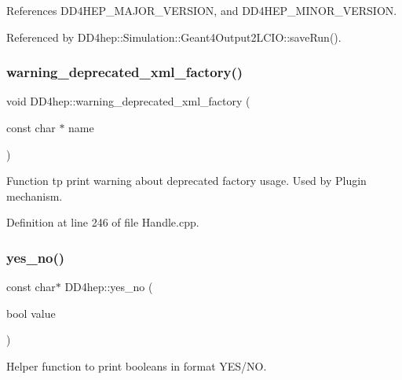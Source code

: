 References D\+D4\+H\+E\+P\+\_\+\+M\+A\+J\+O\+R\+\_\+\+V\+E\+R\+S\+I\+ON, and D\+D4\+H\+E\+P\+\_\+\+M\+I\+N\+O\+R\+\_\+\+V\+E\+R\+S\+I\+ON.



Referenced by D\+D4hep\+::\+Simulation\+::\+Geant4\+Output2\+L\+C\+I\+O\+::save\+Run().

\hypertarget{namespace_d_d4hep_a1726e0eed52fa5804e004e72e8c73775}{}\label{namespace_d_d4hep_a1726e0eed52fa5804e004e72e8c73775} 
\subsubsection{\texorpdfstring{warning\+\_\+deprecated\+\_\+xml\+\_\+factory()}{warning\_deprecated\_xml\_factory()}}
{\footnotesize\ttfamily void D\+D4hep\+::warning\+\_\+deprecated\+\_\+xml\+\_\+factory (\begin{DoxyParamCaption}\item[{const char $\ast$}]{name }\end{DoxyParamCaption})}



Function tp print warning about deprecated factory usage. Used by Plugin mechanism. 



Definition at line 246 of file Handle.\+cpp.

\hypertarget{namespace_d_d4hep_a9b6e2c5ab00340e93017e18604b0cb85}{}\label{namespace_d_d4hep_a9b6e2c5ab00340e93017e18604b0cb85} 
\subsubsection{\texorpdfstring{yes\+\_\+no()}{yes\_no()}}
{\footnotesize\ttfamily const char$\ast$ D\+D4hep\+::yes\+\_\+no (\begin{DoxyParamCaption}\item[{bool}]{value }\end{DoxyParamCaption})\hspace{0.3cm}{\ttfamily [inline]}}



Helper function to print booleans in format Y\+E\+S/\+NO. 



